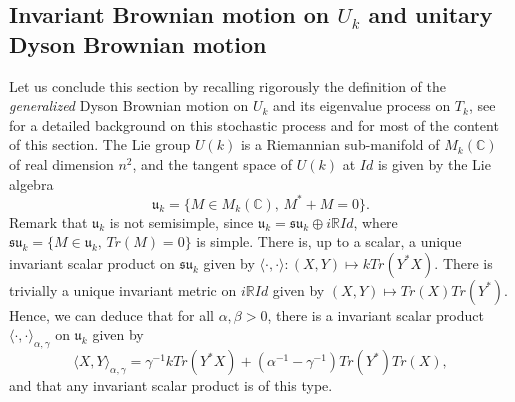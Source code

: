\documentclass[10pt,11pt]{amsart}%
\begin{document}
\subsection{Invariant Brownian motion on $U_k$ and unitary Dyson Brownian motion}\label{Sec:Brownian_motion}
Let us conclude this section by recalling rigorously the definition of the \textit{generalized} Dyson Brownian motion on $U_k$ and its eigenvalue process on $ T_{k}$, see \cite{L} for a detailed background on this stochastic process and \cite{Far} for most of the content of this section. The Lie group $U(k)$ is a Riemannian sub-manifold of $M_{k}(\mathbb{C})$ of real dimension $n^2$, and the tangent space of $U(k)$ at $Id$ is given by the Lie algebra 
$$\mathfrak{u}_k=\{M\in M_k(\mathbb{C}),\, M^*+M=0\}.$$
Remark that $\mathfrak{u}_k$ is not semisimple, since $\mathfrak{u}_k=\mathfrak{su}_k\oplus i\mathbb{R}Id$, where $\mathfrak{su}_k=\{M\in\mathfrak{u}_k,\, Tr(M)=0\}$ is simple. There is, up to a scalar, a unique invariant scalar product on $\mathfrak{su}_k$ given by $\langle \cdot,\cdot\rangle:(X,Y)\mapsto kTr(Y^*X)$. There is trivially a unique invariant metric on $i\mathbb{R}Id$ given by $(X,Y)\mapsto Tr(X) Tr(Y^*)$. Hence, we can deduce that for all $\alpha,\beta> 0$, there is a invariant scalar product $\langle\cdot,\cdot\rangle_{\alpha,\gamma}$ on $\mathfrak{u}_k$ given by
$$\langle X,Y\rangle_{\alpha,\gamma}=\gamma^{-1} k Tr(Y^*X)+(\alpha^{-1}-\gamma^{-1}) Tr(Y^*)Tr(X),$$
and that any invariant scalar product is of this type.
\end{document}
